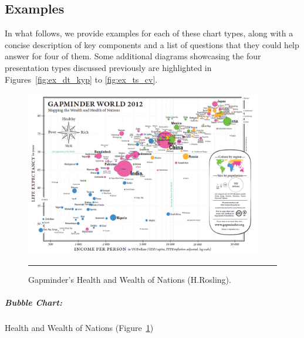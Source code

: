 \subsection{Examples} In what follows, we provide examples for each of these chart types, along with a concise description of key components and a list of questions that they could help answer for four of them. Some additional diagrams showcasing the four presentation types discussed previously are highlighted in Figures~\ref{fig:ex_dt_kyp} to \ref{fig:ex_ts_cv}.
\begin{figure}[t]
\centering
\includegraphics[width=0.92\textwidth]{Images/GapminderMap-2.png}
\caption[\small Bubble Chart: Gapminder's Health and Wealth of Nations ]{\small Gapminder's Health and Wealth of Nations (H.Rosling).} \hrule\label{fig:ex_bc_gap}
\end{figure}
\afterpage{\FloatBarrier}
\subparagraph{Bubble Chart:} Health and Wealth of Nations  (Figure~\ref{fig:ex_bc_gap})
